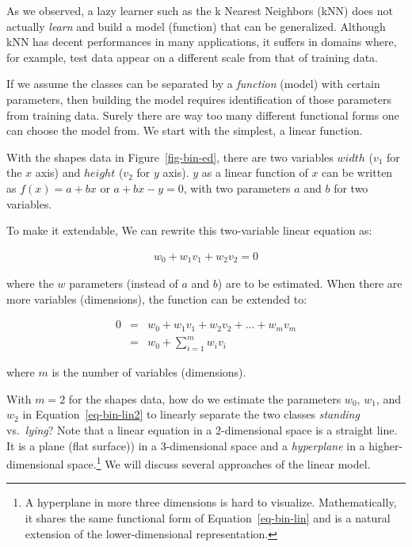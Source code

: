 \documentclass[
  letterpaper,
]{scrbook}
\begin{document}
As we observed, a lazy learner such as the k Nearest Neighbors (kNN)
does not actually \emph{learn} and build a model (function) that can be
generalized. Although kNN has decent performances in many applications,
it suffers in domains where, for example, test data appear on a
different scale from that of training data.

If we assume the classes can be separated by a \emph{function} (model)
with certain parameters, then building the model requires identification
of those parameters from training data. Surely there are way too many
different functional forms one can choose the model from. We start with
the simplest, a linear function.

With the shapes data in Figure~\ref{fig-bin-ed}, there are two variables
\(width\) (\(v_1\) for the \(x\) axis) and \(height\) (\(v_2\) for \(y\)
axis). \(y\) as a linear function of \(x\) can be written as
\(f(x) = a + b x\) or \(a + b x - y = 0\), with two parameters \(a\) and
\(b\) for two variables.

To make it extendable, We can rewrite this two-variable linear equation
as:

\[\begin{aligned}
  w_0 + w_1 v_1 + w_2 v_2 = 0
\end{aligned}\]

where the \(w\) parameters (instead of \(a\) and \(b\)) are to be
estimated. When there are more variables (dimensions), the function can
be extended to:

\[\begin{aligned}
  0
  & = & w_0 + w_1 v_1 + w_2 v_2 + ... + w_m v_m \\
  & = & w_0 + \sum_{i=1}^{m} w_i v_i
\end{aligned}\]

where \(m\) is the number of variables (dimensions).

With \(m=2\) for the shapes data, how do we estimate the parameters
\(w_0\), \(w_1\), and \(w_2\) in
Equation~\hyperref[eq-bin-lin2]{{[}eq-bin-lin2{]}} to linearly separate
the two classes \emph{standing} vs.~\emph{lying}? Note that a linear
equation in a 2-dimensional space is a straight line. It is a plane
(flat surface)) in a 3-dimensional space and a \emph{hyperplane} in a
higher-dimensional space.\footnote{A hyperplane in more three dimensions
  is hard to visualize. Mathematically, it shares the same functional
  form of Equation~\hyperref[eq-bin-lin]{{[}eq-bin-lin{]}} and is a
  natural extension of the lower-dimensional representation.} We will
discuss several approaches of the linear model.
\end{document}
